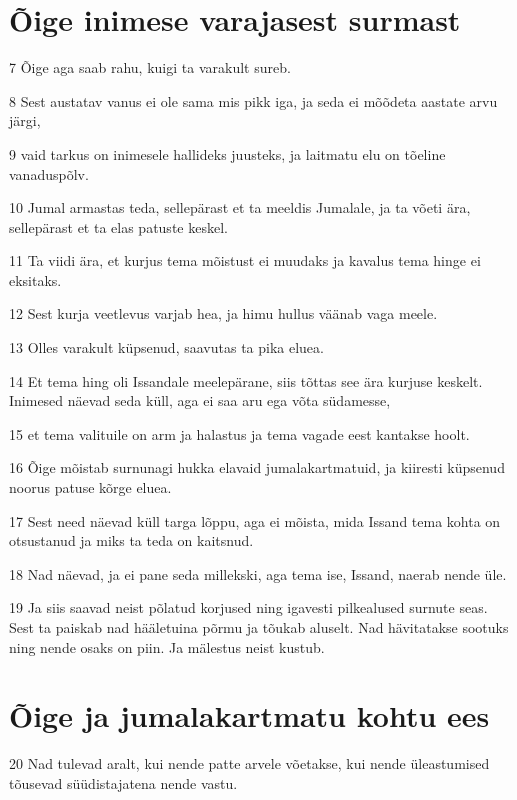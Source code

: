 \section*{Õige inimese varajasest surmast}

\par 7 Õige aga saab rahu, kuigi ta varakult sureb.
\par 8 Sest austatav vanus ei ole sama mis pikk iga, ja seda ei mõõdeta aastate arvu järgi,
\par 9 vaid tarkus on inimesele hallideks juusteks, ja laitmatu elu on tõeline vanaduspõlv.
\par 10 Jumal armastas teda, sellepärast et ta meeldis Jumalale, ja ta võeti ära, sellepärast et ta elas patuste keskel.
\par 11 Ta viidi ära, et kurjus tema mõistust ei muudaks ja kavalus tema hinge ei eksitaks.
\par 12 Sest kurja veetlevus varjab hea, ja himu hullus väänab vaga meele.
\par 13 Olles varakult küpsenud, saavutas ta pika eluea.
\par 14 Et tema hing oli Issandale meelepärane, siis tõttas see ära kurjuse keskelt. Inimesed näevad seda küll, aga ei saa aru ega võta südamesse,
\par 15 et tema valituile on arm ja halastus ja tema vagade eest kantakse hoolt.
\par 16 Õige mõistab surnunagi hukka elavaid jumalakartmatuid, ja kiiresti küpsenud noorus patuse kõrge eluea.
\par 17 Sest need näevad küll targa lõppu, aga ei mõista, mida Issand tema kohta on otsustanud ja miks ta teda on kaitsnud.
\par 18 Nad näevad, ja ei pane seda millekski, aga tema ise, Issand, naerab nende üle.
\par 19 Ja siis saavad neist põlatud korjused ning igavesti pilkealused surnute seas. Sest ta paiskab nad hääletuina põrmu ja tõukab aluselt. Nad hävitatakse sootuks ning nende osaks on piin. Ja mälestus neist kustub. 

\section*{Õige ja jumalakartmatu kohtu ees}

\par 20 Nad tulevad aralt, kui nende patte arvele võetakse, kui nende üleastumised tõusevad süüdistajatena nende vastu. 


